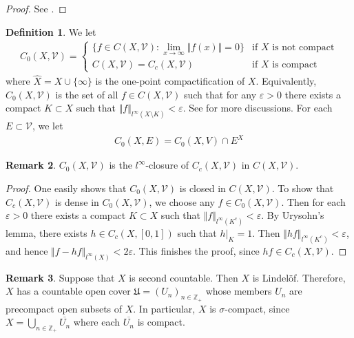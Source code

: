 \documentclass[12pt,b5paper,notitlepage]{article}
\theoremstyle{definition}
\newtheorem{df}{Definition}[section]
\newtheorem{rem}[df]{Remark}
\theoremstyle{plain}
\newcommand{\fk}{\mathfrak}
\newcommand{\mc}{\mathcal}
\newcommand{\wht}{\widehat}
\newcommand{\ovl}{\overline}
\newcommand{\Zbb}{\mathbb Z}
\newcommand{\eps}{\varepsilon}
\numberwithin{equation}{section}
\begin{document}
\begin{proof}
See \cite[Sec. 15.4]{Gui-A}.
\end{proof}



\begin{df}
We let \index{C0@$C_0(X,\mc V),C_0(X,E)$}
\begin{align*}
C_0(X,\mc V)=\left\{
\begin{array}{ll}
\{f\in C(X,\mc V):\lim_{x\rightarrow\infty}\Vert f(x)\Vert=0\}&\text{if $X$ is not compact}\\[0.5ex]
C(X,\mc V)=C_c(X,\mc V)&\text{if $X$ is compact}
\end{array}
\right.
\end{align*}
where $\wht X=X\cup\{\infty\}$ is the one-point compactification of $X$. Equivalently, $C_0(X,\mc V)$ is the set of all $f\in C(X,\mc V)$ such that for any $\eps>0$ there exists a compact $K\subset X$ such that $\Vert f\Vert_{l^\infty(X\setminus K)}<\eps$. See \cite[Subsec. 15.8.1]{Gui-A} for more discussions. For each $E\subset\mc V$, we let
\begin{align*}
C_0(X,E)=C_0(X,V)\cap E^X
\end{align*}
\end{df}


\begin{rem}
$C_0(X,\mc V)$ is the $l^\infty$-closure of $C_c(X,\mc V)$ in $C(X,\mc V)$. 
\end{rem}

\begin{proof}
One easily shows that $C_0(X,\mc V)$ is closed in $C(X,\mc V)$. To show that $C_c(X,\mc V)$ is dense in $C_0(X,\mc V)$, we choose any $f\in C_0(X,\mc V)$. Then for each $\eps>0$ there exists a compact $K\subset X$ such that $\Vert f\Vert_{l^\infty(K^c)}<\eps$. By Urysohn's lemma, there exists $h\in C_c(X,[0,1])$ such that $h|_K=1$. Then $\Vert hf\Vert_{l^\infty(K^c)}<\eps$, and hence $\Vert f-hf\Vert_{l^\infty(X)}<2\eps$. This finishes the proof, since $hf\in C_c(X,\mc V)$.
\end{proof}

\begin{rem}\label{lb84}
Suppose that $X$ is second countable. Then $X$ is Lindel\"of. Therefore, $X$ has a countable open cover $\fk U=(U_n)_{n\in\Zbb_+}$ whose members $U_n$ are precompact open subsets of $X$. In particular, $X$ is $\sigma$-compact, since $X=\bigcup_{n\in\Zbb_+}\ovl{U_n}$ where each $\ovl{U_n}$ is compact.
\end{rem}
\end{document}

